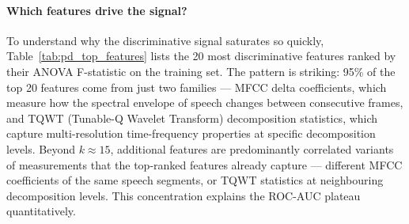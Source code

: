 \documentclass[11pt,a4paper]{article}
\begin{document}
\paragraph{Which features drive the signal?}

To understand why the discriminative signal saturates so quickly,
Table~\ref{tab:pd_top_features} lists the 20 most discriminative features
ranked by their ANOVA F-statistic on the training set. The pattern is
striking: 95\% of the top 20 features come from just two families --- MFCC
delta coefficients, which measure how the spectral envelope of speech changes
between consecutive frames, and TQWT (Tunable-Q Wavelet Transform)
decomposition statistics, which capture multi-resolution time-frequency
properties at specific decomposition levels. Beyond $k \approx 15$,
additional features are predominantly correlated variants of measurements
that the top-ranked features already capture --- different MFCC coefficients
of the same speech segments, or TQWT statistics at neighbouring decomposition
levels. This concentration explains the ROC-AUC plateau quantitatively.
\end{document}

